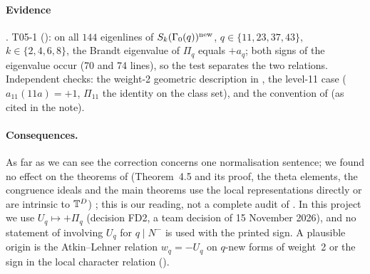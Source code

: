 \paragraph{Evidence} \stcomp. T05-1 (): on all $144$ eigenlines of $S_k(\Gamma_0(q))^{\rm new}$,
$q\in\{11,23,37,43\}$, $k\in\{2,4,6,8\}$, the Brandt eigenvalue of $\Pi_q$ equals $+a_q$; both signs of the eigenvalue occur
(70 and 74 lines), so the test separates the two relations. Independent checks: the weight-2 geometric description in
\cite{Ri90}, the level-11 case ($a_{11}(11a)=+1$, $\Pi_{11}$ the identity on the class set), and the convention of \cite{CH15}
(as cited in the note).

\paragraph{Consequences.} As far as we can see the correction concerns one normalisation sentence; we found no effect on the
theorems of \cite{Hs} (Theorem~4.5 and its proof, the theta elements, the congruence ideals and the main theorems use the
local representations directly or are intrinsic to $\mathbb{T}^D$) \cite[\S4]{LLhsieh}; this is our reading, not a complete audit of
\cite{Hs}. In this project we use $U_q\mapsto+\Pi_q$ (decision FD2, a team decision of 15 November 2026), and no statement of
\cite{Hs} involving $U_q$ for $q\mid N^-$ is used with the printed sign. A plausible origin is the Atkin--Lehner relation
$w_q=-U_q$ on $q$-new forms of weight~2 or the sign in the local character relation (\stconj).
